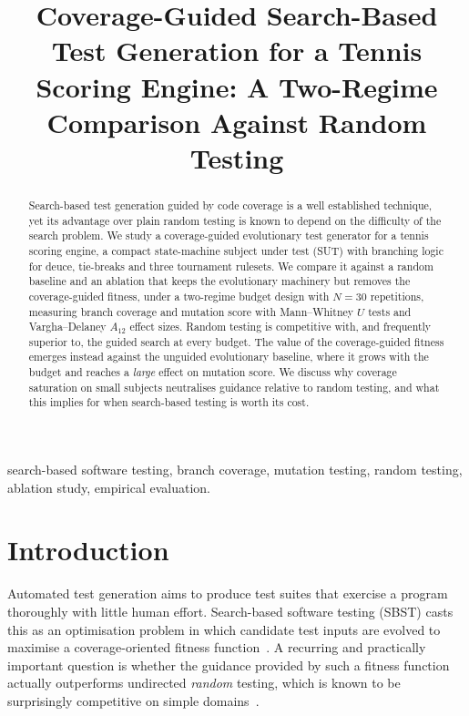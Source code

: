 \documentclass[conference]{IEEEtran}
\begin{document}
\title{Coverage-Guided Search-Based Test Generation for a Tennis Scoring
Engine: A Two-Regime Comparison Against Random Testing}

\author{
}

\maketitle

\begin{abstract}
Search-based test generation guided by code coverage is a well established
technique, yet its advantage over plain random testing is known to depend on
the difficulty of the search problem. We study a coverage-guided evolutionary
test generator for a tennis scoring engine, a compact state-machine subject
under test (SUT) with branching logic for deuce, tie-breaks and three
tournament rulesets. We compare it against a random baseline and an ablation
that keeps the evolutionary machinery but removes the coverage-guided fitness,
under a two-regime budget design with $N{=}30$ repetitions, measuring branch
coverage and mutation score with Mann--Whitney $U$ tests and
Vargha--Delaney $A_{12}$ effect sizes. Random testing is competitive with, and
frequently superior to, the guided search at every budget. The value of the
coverage-guided fitness emerges instead against the unguided evolutionary
baseline, where it grows with the budget and reaches a \emph{large} effect on
mutation score. We discuss why coverage saturation on small subjects
neutralises guidance relative to random testing, and what this implies for when
search-based testing is worth its cost.
\end{abstract}

\begin{IEEEkeywords}
search-based software testing, branch coverage, mutation testing, random
testing, ablation study, empirical evaluation.
\end{IEEEkeywords}

\section{Introduction}
Automated test generation aims to produce test suites that exercise a program
thoroughly with little human effort. Search-based software testing (SBST) casts
this as an optimisation problem in which candidate test inputs are evolved to
maximise a coverage-oriented fitness function~\cite{mcminn2004search,
fraser2011evosuite}. A recurring and practically important question is whether
the guidance provided by such a fitness function actually outperforms undirected
\emph{random} testing, which is known to be surprisingly competitive on simple
domains~\cite{arcuri2012random}.
\end{document}
